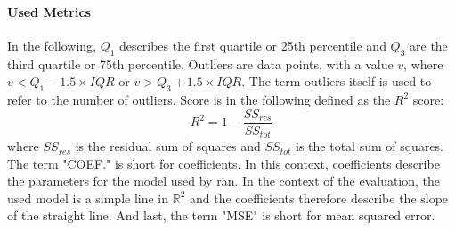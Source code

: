 \paragraph{Used Metrics}
In the following, $Q_1$ describes the first quartile or 25th percentile and $Q_3$ are the third quartile or 75th percentile. Outliers are data points, with a value $v$, where $v<Q_1 -1.5\times IQR$ or $v>Q_3 + 1.5 \times IQR$. The term outliers itself is used to refer to the number of outliers. Score is in the following defined as the $R^2$ score:
\begin{equation}
    R^2 = 1 - \frac{SS_{res}}{SS_{tot}}
\end{equation}
where $SS_{res}$ is the residual sum of squares and $SS_{tot}$ is the total sum of squares. The term "COEF." is short for coefficients. In this context, coefficients describe the parameters for the model used by \gls{ran}. In the context of the evaluation, the used model is a simple line in $\mathbb{R}^2$ and the coefficients therefore describe the slope of the straight line. And last, the term "MSE" is short for mean squared error.
